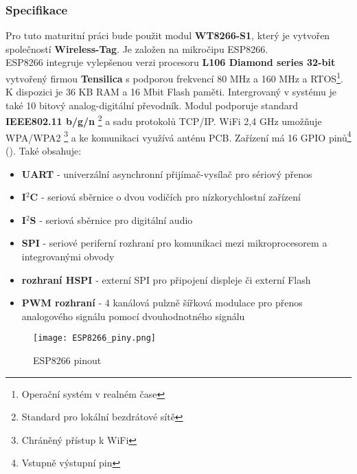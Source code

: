 \documentclass[a4paper, 12pt]{report}
\begin{document}
				\subsubsection{Specifikace}
					Pro tuto maturitní práci bude použit modul \textbf{WT8266-S1}, který je vytvořen společností \textbf{Wireless-Tag}. Je založen na mikročipu ESP8266.\\
					ESP8266 integruje vylepšenou verzi procesoru \textbf{L106 Diamond series 32-bit} vytvořený firmou \textbf{Tensilica} s podporou frekvencí 80 \si{MHz} a 160 \si{MHz} a RTOS\footnote{Operační systém v realném čase}.
					K dispozici je 36 \si{KB} RAM a 16 \si{Mbit} Flash paměti. Intergrovaný v systému je také 10 bitový analog-digitální převodník. Modul podporuje standard {\bf IEEE802.11 b/g/n}	\footnote{Standard pro lokální bezdrátové sítě} a sadu protokolů TCP/IP. WiFi 2,4 \si{GHz} umožňuje WPA/WPA2 \footnote{Chráněný přístup k WiFi} a ke komunikaci využívá anténu PCB. Zařízení má 16 GPIO pinů\footnote{Vstupně výstupní pin} (). Také obsahuje:
					\begin{itemize}
						\item {\bf UART} - univerzální asynchronní přijímač-vysílač pro sériový přenos
						\item {\bf I$^2$C} - seriová sběrnice o dvou vodičích pro nízkorychlostní zařízení
						\item {\bf I$^2$S} - seriová sběrnice pro digitální audio
						\item {\bf SPI} - seriové periferní rozhraní pro komunikaci mezi mikroprocesorem a integrovanými obvody
						\item {\bf rozhraní HSPI} - externí SPI pro připojení displeje či externí Flash
						\item {\bf PWM rozhraní} - 4 kanálová pulzně šířková modulace pro přenos analogového signálu pomocí dvouhodnotného signálu
					\end{itemize}

					\begin{figure}[h]
						\centering
						\texttt{[image: ESP8266\_piny.png]}
						\caption{ESP8266 pinout}
						\label{ESP8266_piny}
					\end{figure}
\end{document}
